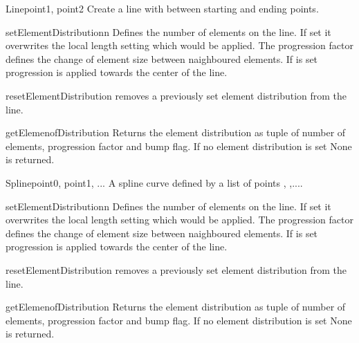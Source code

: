 \begin{classdesc}{Line}{point1, point2}
Create a line with between starting and ending points.
\end{classdesc}
\begin{methoddesc}[Line]{setElementDistribution}{n}
Defines the number of elements on the line. If set it overwrites the local length setting which would be applied. The progression factor  defines the change of element size between naighboured elements. If  is set
progression is applied towards the center of the line.
\end{methoddesc}
\begin{methoddesc}[Line]{resetElementDistribution}{}
removes a previously set element distribution from the line.
\end{methoddesc}
\begin{methoddesc}[Line]{getElemenofDistribution}{}
Returns the element distribution as tuple of
number of elements, progression factor and bump flag. If
no element distribution is set None is returned.
\end{methoddesc}


\begin{classdesc}{Spline}{point0, point1, ...}
A spline curve defined by a list of points , ,....
\end{classdesc}
\begin{methoddesc}[Spline]{setElementDistribution}{n}
Defines the number of elements on the line. If set it overwrites the local length setting which would be applied. The progression factor  defines the change of element size between naighboured elements. If  is set
progression is applied towards the center of the line.
\end{methoddesc}
\begin{methoddesc}[Spline]{resetElementDistribution}{}
removes a previously set element distribution from the line.
\end{methoddesc}
\begin{methoddesc}[Spline]{getElemenofDistribution}{}
Returns the element distribution as tuple of
number of elements, progression factor and bump flag. If
no element distribution is set None is returned.
\end{methoddesc}

